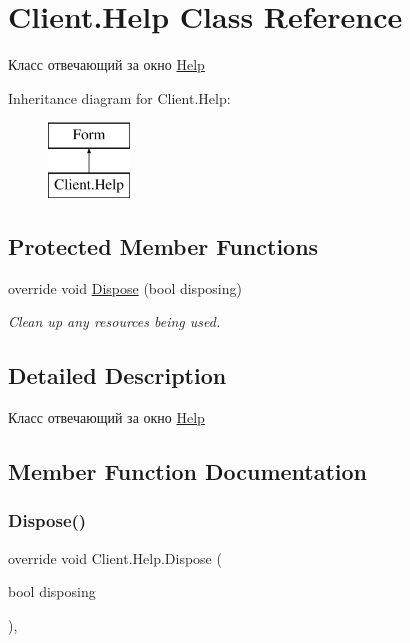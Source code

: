 \hypertarget{class_client_1_1_help}{}\section{Client.\+Help Class Reference}
\label{class_client_1_1_help}


Класс отвечающий за окно \hyperlink{class_client_1_1_help}{Help}  


Inheritance diagram for Client.\+Help\+:\begin{figure}[H]
\begin{center}
\leavevmode
\includegraphics[height=2.000000cm]{class_client_1_1_help}
\end{center}
\end{figure}
\subsection*{Protected Member Functions}
\begin{DoxyCompactItemize}
\item 
override void \hyperlink{class_client_1_1_help_a9cab13fd059101ccbbd6e25e0157fe27}{Dispose} (bool disposing)
\begin{DoxyCompactList}\small\item\em Clean up any resources being used. \end{DoxyCompactList}\end{DoxyCompactItemize}


\subsection{Detailed Description}
Класс отвечающий за окно \hyperlink{class_client_1_1_help}{Help} 



\subsection{Member Function Documentation}
\hypertarget{class_client_1_1_help_a9cab13fd059101ccbbd6e25e0157fe27}{}\label{class_client_1_1_help_a9cab13fd059101ccbbd6e25e0157fe27} 
\subsubsection{\texorpdfstring{Dispose()}{Dispose()}}
{\footnotesize\ttfamily override void Client.\+Help.\+Dispose (\begin{DoxyParamCaption}\item[{bool}]{disposing }\end{DoxyParamCaption})\hspace{0.3cm}{\ttfamily [inline]}, {\ttfamily [protected]}}



